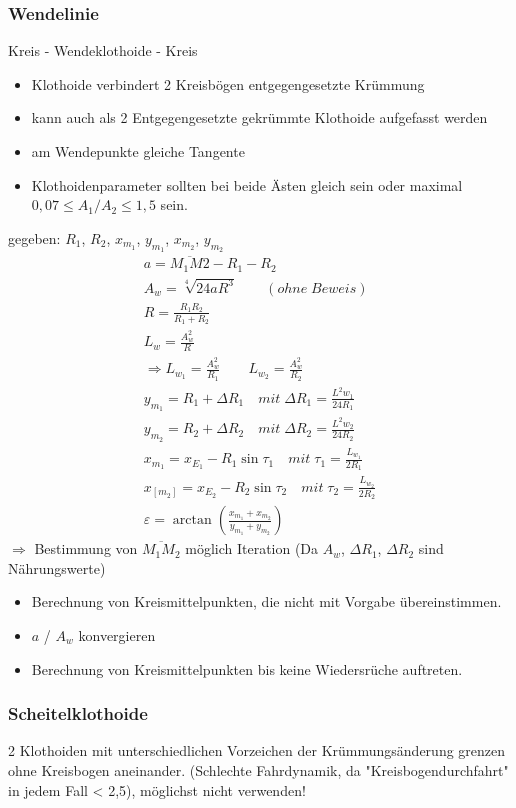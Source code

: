 \documentclass[12pt]{article}
\begin{document}
\subsubsection{Wendelinie}
Kreis - Wendeklothoide - Kreis 
\begin{itemize}
\item Klothoide verbindert 2 Kreisbögen entgegengesetzte Krümmung 
\item kann auch als 2 Entgegengesetzte gekrümmte Klothoide aufgefasst werden
\item am Wendepunkte gleiche Tangente
\item Klothoidenparameter sollten bei beide Ästen gleich sein oder maximal $0,07 \leq A_1/A_2 \leq 1,5$ sein. 
\end{itemize}
gegeben: $R_1$, $R_2$, $x_{m_1}$, $y_{m_1}$, $x_{m_2}$, $y_{m_2}$
\begin{gather*}
a = \overline{M_1 M2} - R_1 - R_2 \\
A_w = \sqrt[4]{24aR^3} \qquad (ohne\; Beweis)\\
R = \frac{R_1 R_2}{R_1 + R_2} \\
L_w = \frac{A_w^2}{R} \\
\Longrightarrow L_{w_1} = \frac{A_w^2}{R_1} \qquad L_{w_2} = \frac{A_w^2}{R_2} \\
y_{m_1} = R_1 + \Delta R_1 \quad mit\; \Delta R_1 = \frac{L^2 w_1}{24 R_1} \\
y_{m_2} = R_2 + \Delta R_2 \quad mit\; \Delta R_2 = \frac{L^2 w_2}{24 R_2} \\
x_{m_1} = x_{E_1} - R_1 \sin \tau_1 \quad mit \; \tau_1 = \frac{L_{w_1}}{2R_1}\\
x_[m_2] = x_{E_2} - R_2 \sin \tau_2 \quad mit \; \tau_2 = \frac{L_{w_2}}{2R_2}\\
\varepsilon = \arctan (\frac{x_{m_1} + x_{m_2}}{y_{m_1} + y_{m_2}})
\end{gather*}
$\Longrightarrow$ Bestimmung von $\overline{M_1 M_2}$ möglich \newline
Iteration (Da $A_w$, $\Delta R_1$, $\Delta R_2$ sind Nährungswerte)
\begin{itemize}
\item Berechnung von Kreismittelpunkten, die nicht mit Vorgabe übereinstimmen. 
\item $a$ / $A_w$ konvergieren
\item Berechnung von Kreismittelpunkten bis keine Wiedersrüche auftreten.
\end{itemize}
\subsubsection{Scheitelklothoide}
2 Klothoiden mit unterschiedlichen Vorzeichen der Krümmungsänderung grenzen ohne Kreisbogen aneinander. (Schlechte Fahrdynamik, da "Kreisbogendurchfahrt" in jedem Fall < 2,5), möglichst nicht verwenden! 
\end{document}
